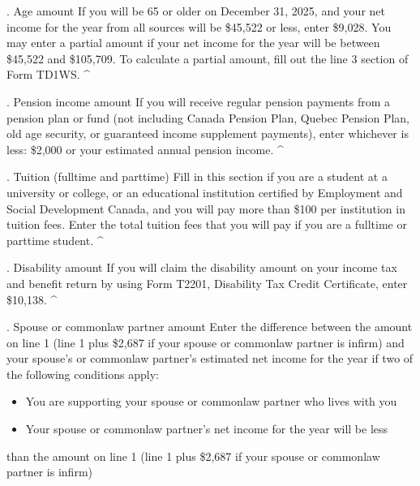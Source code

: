 \documentclass[letterpaper,10pt,english]{sphinxmanual}
\begin{document}
. Age amount \sphinxhyphen{} If you will be 65 or older on December 31, 2025, and your net
income for the year from all sources will be \$45,522 or less, enter \$9,028.
You may enter a partial amount if your net income for the year will be
between \$45,522 and \$105,709. To calculate a partial amount, fill out the
line 3 section of Form TD1\sphinxhyphen{}WS. \textasciicircum{}

. Pension income amount \sphinxhyphen{} If you will receive regular pension payments from
a pension plan or fund (not including Canada Pension Plan, Quebec Pension
Plan, old age security, or guaranteed income supplement payments), enter
whichever is less: \$2,000 or your estimated annual pension income. \textasciicircum{}

. Tuition (full\sphinxhyphen{}time and part\sphinxhyphen{}time) \sphinxhyphen{} Fill in this section if you are a
student at a university or college, or an educational institution certified
by Employment and Social Development Canada, and you will pay more than \$100
per institution in tuition fees. Enter the total tuition fees that you will
pay if you are a full\sphinxhyphen{}time or part\sphinxhyphen{}time student. \textasciicircum{}

. Disability amount \sphinxhyphen{} If you will claim the disability amount on your income
tax and benefit return by using Form T2201, Disability Tax Credit
Certificate, enter \$10,138. \textasciicircum{}

. Spouse or common\sphinxhyphen{}law partner amount \sphinxhyphen{} Enter the difference between the
amount on line 1 (line 1 plus \$2,687 if your spouse or common\sphinxhyphen{}law partner is
infirm) and your spouse’s or common\sphinxhyphen{}law partner’s estimated net income for
the year if two of the following conditions apply:
\begin{itemize}
\item {} 
\sphinxAtStartPar
You are supporting your spouse or common\sphinxhyphen{}law partner who lives with you

\item {} 
\sphinxAtStartPar
Your spouse or common\sphinxhyphen{}law partner’s net income for the year will be less

\end{itemize}

\sphinxAtStartPar
than the amount on line 1 (line 1 plus \$2,687 if your spouse or common\sphinxhyphen{}law
partner is infirm)
\end{document}
